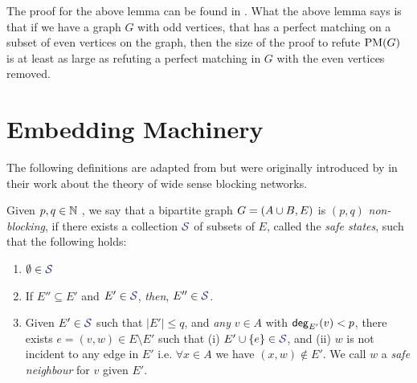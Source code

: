 \documentclass[11pt]{article}
\begin{document}
The proof for the above lemma can be found in \citep[Lemma 2.2]{Austrin_2022}.
What the above lemma says is that if we have a graph $G$ with odd vertices, that has a perfect matching on a subset of even vertices on the graph, then the size of the proof to refute $\text{PM}(G)$ is at least as large as refuting a perfect matching in $G$ with the even vertices removed.


\section{Embedding Machinery}
\label{sec:embed-machinery}
The following definitions are adapted from \citep{nenadov2023routing} but were originally introduced by \citet{feldman1988wide} in their work about the theory of wide sense blocking networks.

\begin{definition}
Given $p,q \in \mathbb{N}$ , we say that a bipartite graph $G = (A \cup B, E)$ is $(p, q)$ \emph{non-blocking}, if there exists a collection  $\Family{S}$ of subsets of $E$, called the \emph{safe states}, such that the following holds:

\begin{enumerate}
	\item $\emptyset \in \Family{S}$
	\item If $E'' \subseteq E'$ and $E' \in \Family{S}$, \emph{then}, $E'' \in \Family{S}$.
	\item Given $E' \in \Family{S}$ such that $|E'| \leq q$, and \emph{any} $v \in A$ with $\mathsf{deg}_{E'}(v) < p$, there exists $e = (v, w) \in E \setminus E'$  such that (i) $E' \cup \Set{e} \in \SafeStates $, and (ii) $w$ is not incident to any edge in $E'$ i.e. $\forall x \in A$ we have $(x,w) \notin E'$. 
 We call $w$ a \emph{safe neighbour} for $v$ given $E'$.
\end{enumerate}

\end{definition}
\end{document}
